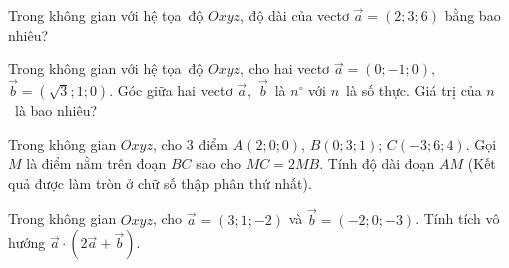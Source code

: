 \begin{bt}%
	Trong không gian với hệ tọa~độ $Oxyz$, độ dài của vectơ $\overrightarrow{a}=(2; 3; 6)$ bằng bao nhiêu? 
\end{bt}

\begin{bt}%
	Trong không gian với  hệ tọa~độ $Oxyz$, cho hai vectơ $\overrightarrow{a}=(0;-1; 0),$ $ \overrightarrow{b}=\left(\sqrt{3}; 1; 0\right)$. Góc giữa hai vectơ $\overrightarrow{a},$ $ \overrightarrow{b}$~là $n^{\circ}$ với $n$~là số thực. Giá trị của $n$~là bao nhiêu?
\end{bt}

\begin{bt}%
	Trong không gian $Oxyz$, cho $3$ điểm $A(2;0;0)$, $B(0;3;1)$; $C(-3;6;4)$. Gọi $M$ là điểm nằm trên đoạn $BC$ sao cho $MC=2MB$. Tính độ dài đoạn $AM$ (Kết quả được làm tròn ở chữ  số thập phân thứ nhất).
\end{bt}

\begin{bt}%
	Trong không gian  $Oxyz$, cho $\overrightarrow{a}=(3;1;-2)$ và $\overrightarrow{b}=(-2;0;-3)$. Tính tích vô hướng $\overrightarrow{a} \cdot(2 \overrightarrow{a}+\overrightarrow{b})$.
\end{bt}

